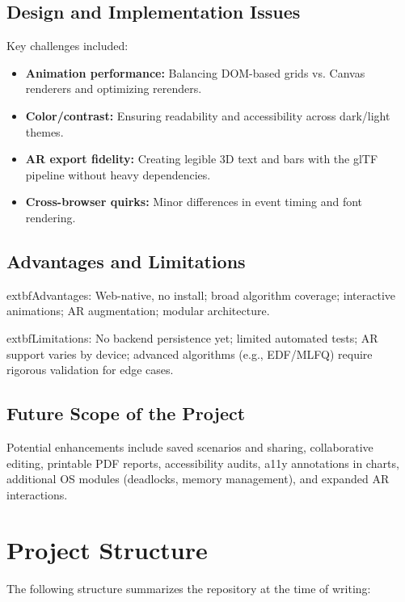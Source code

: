 \documentclass[12pt,a4paper,oneside]{report}
\begin{document}
\section{Design and Implementation Issues}
Key challenges included:
\begin{itemize}
  \item \textbf{Animation performance:} Balancing DOM-based grids vs. Canvas renderers and optimizing rerenders.
  \item \textbf{Color/contrast:} Ensuring readability and accessibility across dark/light themes.
  \item \textbf{AR export fidelity:} Creating legible 3D text and bars with the glTF pipeline without heavy dependencies.
  \item \textbf{Cross-browser quirks:} Minor differences in event timing and font rendering.
\end{itemize}

\section{Advantages and Limitations}
	extbf{Advantages:} Web-native, no install; broad algorithm coverage; interactive animations; AR augmentation; modular architecture.

	extbf{Limitations:} No backend persistence yet; limited automated tests; AR support varies by device; advanced algorithms (e.g., EDF/MLFQ) require rigorous validation for edge cases.

\section{Future Scope of the Project}
Potential enhancements include saved scenarios and sharing, collaborative editing, printable PDF reports, accessibility audits, a11y annotations in charts, additional OS modules (deadlocks, memory management), and expanded AR interactions.

\appendix
\chapter{Project Structure}
The following structure summarizes the repository at the time of writing:
\end{document}
